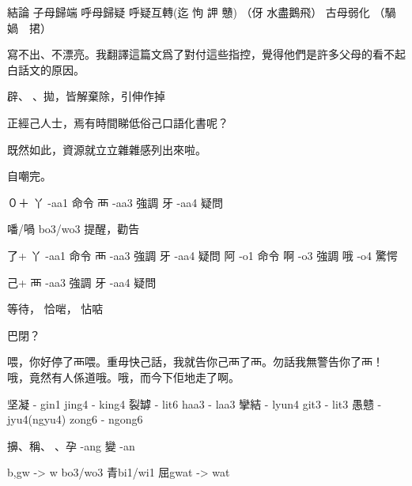 結論
子母歸端
呼母歸疑 呼疑互轉(迄 怐 䛅 戇) （伢 水盡鵝飛）
古母弱化 （騧　媧　捃）

寫不出、不漂亮。我翻譯這篇文爲了對付這些指控，覺得他們是許多父母的看不起白話文的原因。

辟、𠌸、拋，皆解棄除，引伸作掉

正經己人士，焉有時間睇低俗己口語化書呢？

既然如此，資源就立立雜雜感列出來啦。

自嘲完。

０＋
丫	-aa1	命令
襾	-aa3	強調
牙	-aa4	疑問

噃/喎	bo3/wo3	提醒，勸告

了+
丫	-aa1	命令
襾	-aa3	強調
牙	-aa4	疑問
阿	-o1	命令
啊	-o3	強調
哦	-o4	驚愕


己+
襾	-aa3	強調
牙	-aa4	疑問

等待， 恰啱， 怗𠶧

巴閉？

喂，你好停了襾喂。重毋快己話，我就告你己襾了襾。勿話我無警告你了襾！
哦，竟然有人係道哦。哦，而今下佢地走了啊。

坚凝 - gin1 jing4 - king4
裂罅 - lit6 haa3 - laa3
攣結 - lyun4 git3 - lit3
愚戆 - jyu4(ngyu4) zong6 - ngong6

擤、稱、𨆐、孕  -ang 變 -an

b,gw -> w
bo3/wo3
青bi1/wi1
屈gwat -> wat
